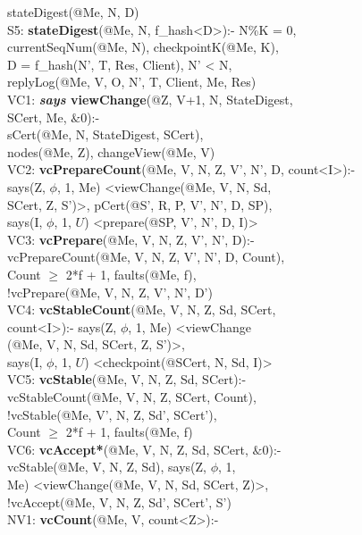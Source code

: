 \begin{code}
\> stateDigest(@Me, N, D)\\
S5: \textbf{stateDigest}(@Me, N, f\_hash<D>):- N\%K = 0,\\
\> currentSeqNum(@Me, N), checkpointK(@Me, K), \\
\> D = f\_hash(N', T, Res, Client), N' < N,\\
\> replyLog(@Me, V, O, N', T, Client, Me, Res)\\
VC1: \textbf{\textit{says} viewChange}(@Z, V+1, N, StateDigest, \\
\> SCert, Me, $\&0$):- \\
\> sCert(@Me, N, StateDigest, SCert), \\
\> nodes(@Me, Z), changeView(@Me, V)\\
VC2: \textbf{vcPrepareCount}(@Me, V, N, Z, V', N', D, count<I>):-\\
\> says(Z, $\phi$, 1, Me) <viewChange(@Me, V, N, Sd,  \\
\> SCert, Z, S')>, pCert(@S', R, P, V', N', D, SP),\\
\> says(I, $\phi$, 1, $U$) <prepare(@SP, V', N', D, I)>\\
VC3: \textbf{vcPrepare}(@Me, V, N, Z, V', N', D):-\\
\> vcPrepareCount(@Me, V, N, Z, V', N', D, Count),\\
\> Count $\geq$ 2*f + 1, faults(@Me, f),\\
\> !vcPrepare(@Me, V, N, Z, V', N', D')\\
VC4: \textbf{vcStableCount}(@Me, V, N, Z, Sd, SCert, \\
\> count<I>):- says(Z, $\phi$, 1, Me) <viewChange\\
\> (@Me, V, N, Sd, SCert, Z, S')>,\\
\> says(I, $\phi$, 1, $U$) <checkpoint(@SCert, N, Sd, I)>\\
VC5: \textbf{vcStable}(@Me, V, N, Z, Sd, SCert):-\\
\> vcStableCount(@Me, V, N, Z, SCert, Count),\\
\> !vcStable(@Me, V', N, Z, Sd', SCert'),\\
\> Count $\geq$ 2*f + 1, faults(@Me, f)\\
VC6: \textbf{vcAccept*}(@Me, V, N, Z, Sd, SCert, $\&0$):-\\
\> vcStable(@Me, V, N, Z, Sd), says(Z, $\phi$, 1, \\
\> Me) <viewChange(@Me, V, N, Sd, SCert, Z)>,\\
\> !vcAccept(@Me, V, N, Z, Sd', SCert', S')\\
NV1: \textbf{vcCount}(@Me, V, count<Z>):-\\

\end{code}
